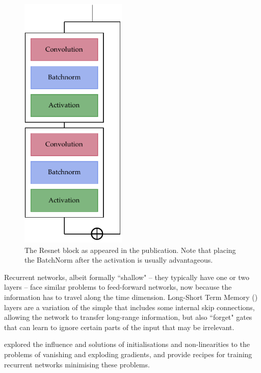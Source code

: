 \begin{figure}[!htb]
	\centering
	\includegraphics[width=0.45\textwidth]{machine_learning/figures/resnet}
	\caption{The Resnet block as appeared in the publication.
	Note that placing the BatchNorm after the activation is usually advantageous.}\label{fig:resnet}
\end{figure}

Recurrent networks,  albeit formally ``shallow" -- they typically have one or two layers -- face similar problems 
to feed-forward networks, now because the information has to travel along the time dimension. 
Long-Short Term Memory (\LSTM) layers are a variation of the simple \RNN{} that includes some internal skip connections, allowing the network to transfer long-range information, but also ``forget" gates that can learn to ignore certain parts of the input that may be irrelevant.

\citet{difficult_recurrent} explored the influence and solutions of initialisations and non-linearities 
to the problems of vanishing and exploding gradients, and provide recipes for training recurrent networks minimising these problems.


